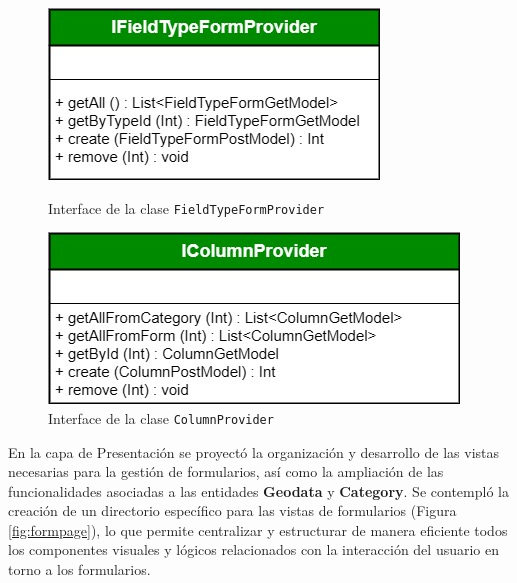 \documentclass{article}
\begin{document}
\begin{figure}[H]
  \centering
  \begin{minipage}[b]{0.43\textwidth}
    \centering
    \includegraphics[width=\textwidth]{images/form_provider.jpg}
    \caption{Interface de la clase \texttt{FieldTypeFormProvider}}
    \label{fig:iformprovider}
  \end{minipage}
  \hspace{0.02\textwidth}
  \begin{minipage}[b]{0.47\textwidth}
    \centering
    \includegraphics[width=\textwidth]{images/column_provider.jpg}
    \caption{Interface de la clase \texttt{ColumnProvider}}
    \label{fig:icolumnprovider}
  \end{minipage}
\end{figure}

En la capa de Presentación se proyectó la organización y desarrollo de las vistas necesarias para la gestión de formularios, así como la ampliación de las funcionalidades asociadas a las entidades \textbf{Geodata} y \textbf{Category}. Se contempló la creación de un directorio específico para las vistas de formularios (Figura \ref{fig:formpage}), lo que permite centralizar y estructurar de manera eficiente todos los componentes visuales y lógicos relacionados con la interacción del usuario en torno a los formularios.
\end{document}
